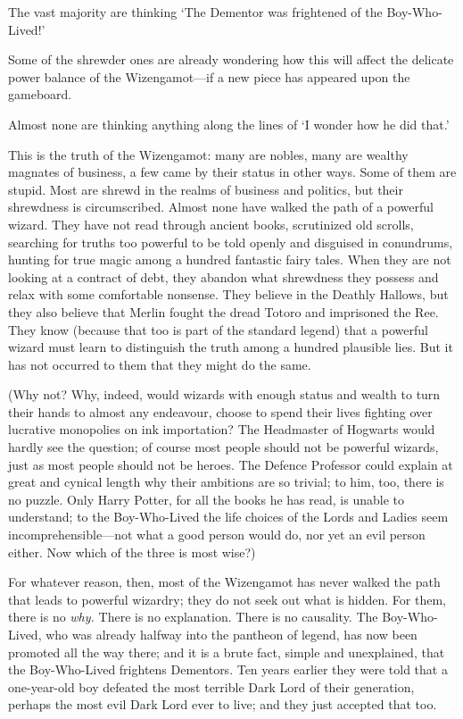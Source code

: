 The vast majority are thinking `The Dementor was frightened of the
Boy-Who-Lived!'

Some of the shrewder ones are already wondering how this will affect the
delicate power balance of the Wizengamot—if a new piece has appeared upon the
gameboard.

Almost none are thinking anything along the lines of `I wonder how he did that.'

This is the truth of the Wizengamot: many are nobles, many are wealthy magnates
of business, a few came by their status in other ways. Some of them are stupid.
Most are shrewd in the realms of business and politics, but their shrewdness is
circumscribed. Almost none have walked the path of a powerful wizard. They have
not read through ancient books, scrutinized old scrolls, searching for truths
too powerful to be told openly and disguised in conundrums, hunting for true magic
among a hundred fantastic fairy tales. When they are not looking at a contract
of debt, they abandon what shrewdness they possess and relax with some
comfortable nonsense. They believe in the Deathly Hallows, but they also
believe that Merlin fought the dread Totoro and imprisoned the Ree. They know
(because that too is part of the standard legend) that a powerful wizard must
learn to distinguish the truth among a hundred plausible lies. But it has not
occurred to them that they might do the same.

(Why not? Why, indeed, would wizards with enough status and wealth to turn
their hands to almost any endeavour, choose to spend their lives fighting over
lucrative monopolies on ink importation? The Headmaster of Hogwarts would
hardly see the question; of course most people should not be powerful wizards,
just as most people should not be heroes. The Defence Professor could explain
at great and cynical length why their ambitions are so trivial; to him, too,
there is no puzzle. Only Harry Potter, for all the books he has read, is unable
to understand; to the Boy-Who-Lived the life choices of the Lords and Ladies
seem incomprehensible—not what a good person would do, nor yet an evil person
either. Now which of the three is most wise?)

For whatever reason, then, most of the Wizengamot has never walked the path
that leads to powerful wizardry; they do not seek out what is hidden. For them,
there is no \emph{why.} There is no explanation. There is no causality. The
Boy-Who-Lived, who was already halfway into the pantheon of legend, has now
been promoted all the way there; and it is a brute fact, simple and
unexplained, that the Boy-Who-Lived frightens Dementors. Ten years earlier they
were told that a one-year-old boy defeated the most terrible Dark Lord of their
generation, perhaps the most evil Dark Lord ever to live; and they just
accepted that too.

